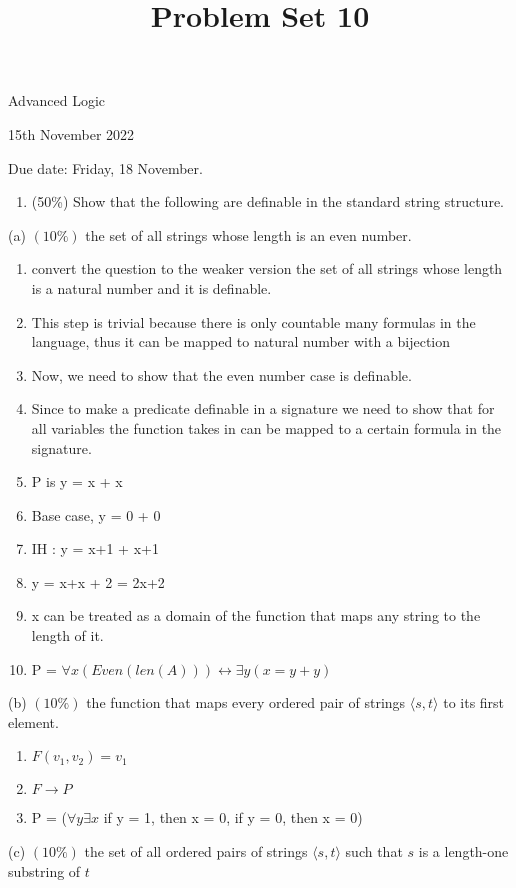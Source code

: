\documentclass[10pt]{article}
\title{Problem Set 10 }
\author{}
\date{}
\begin{document}
\maketitle
Advanced Logic

15th November 2022

Due date: Friday, 18 November.

\begin{enumerate}
  \item (50\%) Show that the following are definable in the standard string structure.
\end{enumerate}

(a) \((10 \%)\) the set of all strings whose length is an even number.
\begin{enumerate}
  \item convert the question to the weaker version the set of all strings whose length is a natural number and it is definable.  
  \item This step is trivial because there is only countable many formulas in the language, thus it can be mapped to natural number with a bijection
  \item Now, we need to show that the even number case is definable. 
  \item Since to make a predicate definable in a signature we need to show that for all variables the function takes in can be mapped to a certain formula in the signature.
  \item P is y = x + x 
  \item Base case, y = 0 + 0
  \item IH : y = x+1 + x+1 
  \item y = x+x + 2  = 2x+2
  \item x can be treated as a domain of the function that maps any string to the length of it.
  \item P = $\forall x( Even(len(A))) \leftrightarrow \exists y( x = y + y) $
\end{enumerate}
(b) \((10 \%)\) the function that maps every ordered pair of strings \(\langle s, t\rangle\) to its first element.
\begin{enumerate}
  \item $F(v_1, v_2) = v_1$ 
  \item $F \rightarrow P$
  \item P = ($\forall y \exists x $ if y = 1, then x = 0, if y = 0, then x = 0)
\end{enumerate}
(c) \((10 \%)\) the set of all ordered pairs of strings \(\langle s, t\rangle\) such that \(s\) is a length-one substring of \(t\)
\end{document}
